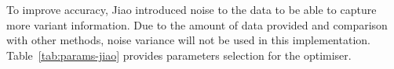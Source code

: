 %
%
To improve accuracy, Jiao introduced noise to the data to be able to capture more variant information.
Due to the amount of data provided and comparison with other methods, noise variance will not be used in this implementation.
\mbox{Table~\ref{tab:params-jiao}} provides parameters selection for the optimiser.
\begin{table}[ht]
    \renewcommand{\arraystretch}{1.3}
    \caption{Hyper-Parameters as per Jiao et al.~\cite{jiao_gru-rnn_2020}}
    \centering
    \label{tab:params-jiao}
\end{table}
\newpage